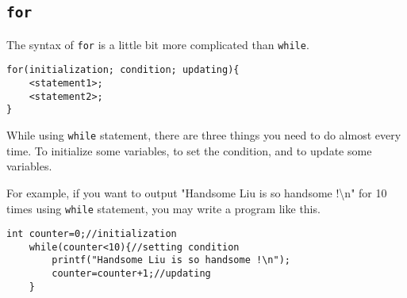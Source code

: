 \documentclass{report}
\newcommand{\bs}{\textbackslash}
\begin{document}
    \subsection{\texttt{for}}
    The syntax of \texttt{for} is a little bit more complicated than \texttt{while}.
    \begin{lstlisting}[xleftmargin=.4\textwidth]
for(initialization; condition; updating){
    <statement1>;
    <statement2>;
}
    \end{lstlisting}
    While using \texttt{while} statement, there are three things you need to do almost every time. To initialize some variables, to set the condition, and to update some variables.

    For example, if you want to output "Handsome Liu is so handsome !\bs n" for 10 times using \texttt{while} statement, you may write a program like this.
\begin{lstlisting}[style=CStyle]
    int counter=0;//initialization
    while(counter<10){//setting condition
        printf("Handsome Liu is so handsome !\n");
        counter=counter+1;//updating
    }
\end{lstlisting}
\end{document}
